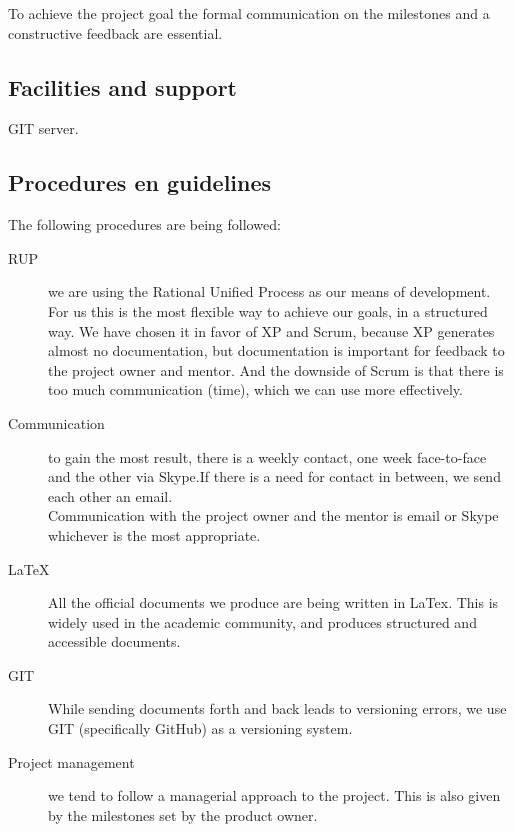 \documentclass{article}
\begin{document}
\begin{itemize}
To achieve the project goal the formal communication on the milestones and a constructive feedback are essential.

\subsection{Facilities and support}

GIT server.

\subsection{Procedures en guidelines}
The following procedures are being followed:
\begin{description}
  \item[RUP] we are using the Rational Unified Process as our means of development. For us this is the most flexible way to achieve our goals, in a structured way. We have chosen it in favor of XP and Scrum, because XP generates almost no documentation, but documentation is important for feedback to the project owner and mentor. And the downside of Scrum is that there is too much communication (time), which we can use more effectively.
  \item[Communication] to gain the most result, there is a weekly contact, one week face-to-face and the other via Skype.If there is a need for contact in between, we send each other an email.\\
Communication with the project owner and the mentor is email or Skype whichever is the most appropriate.
  \item[LaTeX] All the official documents we produce are being written in LaTex. This is widely used in the academic community, and produces structured and accessible documents.
  \item[GIT] While sending documents forth and back leads to versioning errors, we use GIT (specifically GitHub) as a versioning system.
  \item[Project management] we tend to follow a managerial approach to the project. This is also given by the milestones set by the product owner.
\end{description}


\end{itemize}
\end{document}

